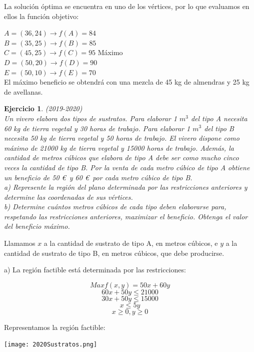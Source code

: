 \documentclass[12pt, a4paper]{amsart}
\newtheorem{ejer}{Ejercicio}
\newcommand{\s}{\color[rgb]{0,0,0.5}}
\newcommand{\n}{\color[rgb]{0,0,0}}
\begin{document}
La solución óptima se encuentra en uno de los vértices, por lo que evaluamos en ellos la función objetivo:

$A=(36,24) \rightarrow f(A)=84$\\

$B=(35,25) \rightarrow f(B)=85$\\

$C=(45,25) \rightarrow f(C)=95$ Máximo\\

$D=(50,20) \rightarrow f(D)=90$\\

$E=(50,10) \rightarrow f(E)=70$\\

El máximo beneficio se obtendrá con una mezcla de 45 kg de almendras y 25 kg de avellanas.

\n

\begin{ejer}\em (2019-2020)\\
Un vivero elabora dos tipos de sustratos. Para elaborar 1 $m^3$ del tipo A necesita 60 kg de tierra vegetal y 30 horas de trabajo. Para elaborar 1 $m^3$ del tipo B necesita 50 kg de tierra vegetal y 50 horas de trabajo. El vivero
dispone como máximo de 21000 kg de tierra vegetal y 15000 horas de trabajo. Además, la cantidad de metros cúbicos que elabora de tipo A debe ser como mucho cinco veces la cantidad de tipo B. Por la venta de cada metro cúbico de tipo A obtiene un beneficio de 50 \euro\ y 60 \euro\ por cada metro cúbico de tipo B.\\
a) Represente la región del plano determinada por las restricciones anteriores y determine las coordenadas de sus vértices.\\
b) Determine cuántos metros cúbicos de cada tipo deben elaborarse para, respetando las restricciones anteriores, maximizar el beneficio. Obtenga el valor del beneficio máximo.
\end{ejer}
\s
Llamamos $x$ a la cantidad de sustrato de tipo A, en metros cúbicos, e $y$ a la cantidad de sustrato de tipo B, en metros cúbicos, que debe producirse.

a) La región factible está determinada por las restricciones:

\[Max f(x,y)=50x+60y\]
\[60x+50y\leqslant 21000\]
\[30x+50y\leqslant 15000\]
\[x\leqslant 5y\]
\[x\geqslant 0, y\geqslant 0\]


Representamos la región factible:
\begin{center}
\texttt{[image: 2020Sustratos.png]}
\end{center}
\end{document}
